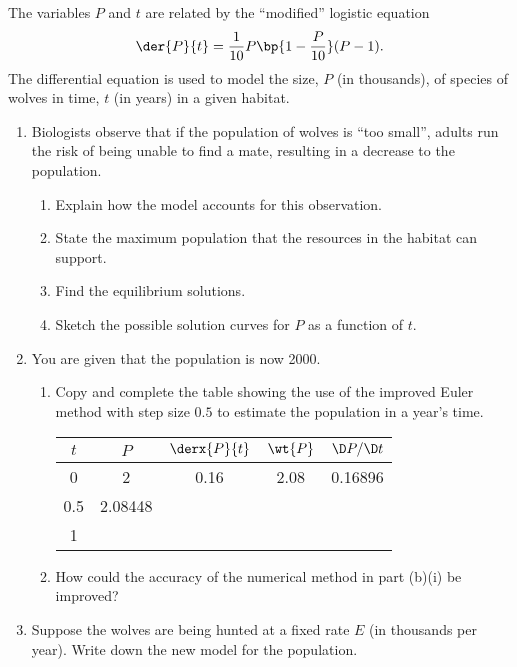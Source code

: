 \begin{problem}
    The variables $P$ and $t$ are related by the ``modified'' logistic equation \[\der{P}{t} = \frac1{10} P\bp{1 - \frac{P}{10}} (P - 1).\] The differential equation is used to model the size, $P$ (in thousands), of species of wolves in time, $t$ (in years) in a given habitat.

    \begin{enumerate}
        \item Biologists observe that if the population of wolves is ``too small'', adults run the risk of being unable to find a mate, resulting in a decrease to the population.
        \begin{enumerate}
            \item Explain how the model accounts for this observation.
            \item State the maximum population that the resources in the habitat can support.
            \item Find the equilibrium solutions.
            \item Sketch the possible solution curves for $P$ as a function of $t$.
        \end{enumerate}
        \item You are given that the population is now 2000.
        \begin{enumerate}
            \item Copy and complete the table showing the use of the improved Euler method with step size $0.5$ to estimate the population in a year's time.
            \begin{table}[H]
                \centering
                \begin{tabular}{|c|c|c|c|c|}
                \hline
                $t$ & $P$ & $\derx{P}{t}$ & $\wt{P}$ & $\D P / \D t$ \\ \hline\hline
                0 & 2 & 0.16 & 2.08 & 0.16896 \\ \hline
                0.5 & 2.08448 & & & \\ \hline
                1 & & \cellcolor{black!10} & \cellcolor{black!10} &  \cellcolor{black!10} \\ \hline
                \end{tabular}
            \end{table}
            \item How could the accuracy of the numerical method in part (b)(i) be improved?
        \end{enumerate}
        \item Suppose the wolves are being hunted at a fixed rate $E$ (in thousands per year). Write down the new model for the population.
    \end{enumerate}
\end{problem}